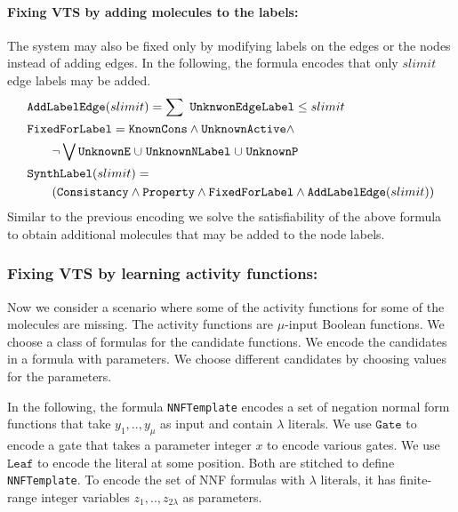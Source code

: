 \paragraph{\bf Fixing VTS by adding molecules to the labels:}
The system may also be fixed only by modifying labels on the edges or the nodes instead
of adding edges.
%
In the following, the formula encodes that only $slimit$ edge labels may be added.
\begin{align*}
  &\texttt{AddLabelEdge}(slimit) = 
    \sum~\texttt{UnknwonEdgeLabel}  \leq slimit\\
  & \texttt{FixedForLabel} = \texttt{KnownCons} \land \texttt{UnknownActive} \land\\
  & \quad \quad \lnot \bigvee \texttt{UnknownE} \;{\cup}\;
                    \texttt{UnknownNLabel} \;{\cup}\;
                    \texttt{UnknownP}\\
  &\texttt{SynthLabel}(slimit) = \\
  & \quad\quad
    (  \texttt{Consistancy}\land \texttt{Property} \land
   \texttt{FixedForLabel} \land \texttt{AddLabelEdge}(slimit) )
\end{align*} 
Similar to the previous encoding we solve the
satisfiability of the above formula to obtain additional molecules
that may be added to the node labels.



\subsubsection{Fixing VTS by learning activity functions:}

Now we consider a scenario where some of the activity functions for some of the molecules
are missing.
%
The activity functions are $\mu$-input Boolean functions.
%
We choose a class of formulas for the candidate functions.
%
We encode the candidates in a formula with parameters.
%
We choose different candidates by choosing values for the parameters.


In the following, the formula \texttt{NNFTemplate} encodes a set of
negation normal form functions that take $y_1,..,y_\mu$ as input and
contain $\lambda$ literals.
%
We use $\texttt{Gate}$ to encode a gate that takes a parameter integer
$x$ to encode various gates.
%
We use $\texttt{Leaf} $ to encode the literal at some position.
%
Both are stitched to define \texttt{NNFTemplate}.
%
To encode the set of NNF formulas with $\lambda$ literals, it has
finite-range integer variables
$z_1,..,z_{2\lambda}$ as parameters.

